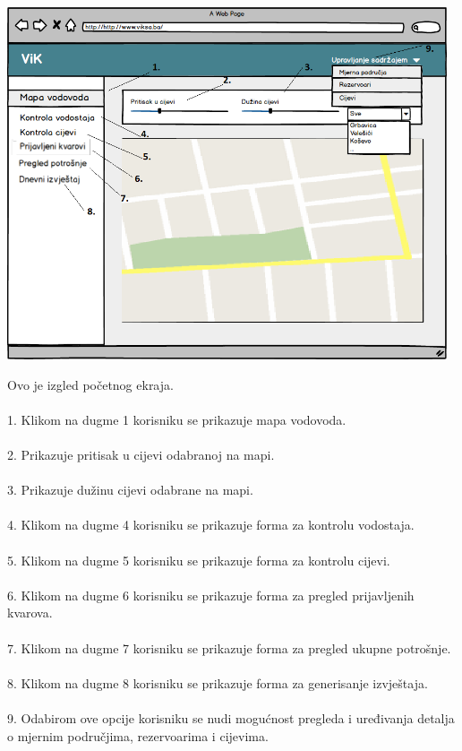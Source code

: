 \documentclass[]{report}
\begin{document}
\begin{center}
\includegraphics[width=13cm]{UI3.png}
\end{center}

Ovo je izgled početnog ekraja.
\\
\\
1. Klikom na dugme 1 korisniku se prikazuje mapa vodovoda.
\\
\\
2. Prikazuje pritisak u cijevi odabranoj na mapi.
\\
\\
3. Prikazuje dužinu cijevi odabrane na mapi.
\\
\\
4. Klikom na dugme 4 korisniku se prikazuje forma za kontrolu vodostaja.
\\
\\
5. Klikom na dugme 5 korisniku se prikazuje forma za kontrolu cijevi.
\\
\\
6. Klikom na dugme 6 korisniku se prikazuje forma za pregled prijavljenih kvarova.
\\
\\
7. Klikom na dugme 7 korisniku se prikazuje forma za pregled ukupne potrošnje.
\\
\\
8. Klikom na dugme 8 korisniku se prikazuje forma za generisanje izvještaja.
\\
\\
9. Odabirom ove opcije korisniku se nudi mogućnost pregleda i uređivanja detalja o mjernim područjima, rezervoarima i cijevima.
\end{document}
